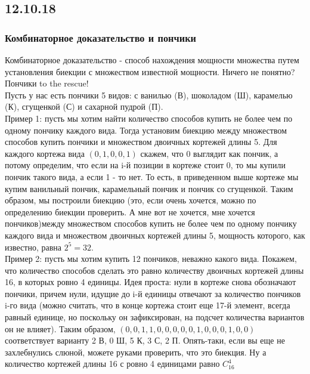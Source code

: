 \subsection{12.10.18}
\subsubsection{Комбинаторное доказательство и пончики}
Комбинаторное доказательство - способ нахождения мощности множества путем установления биекции с множеством известной мощности. Ничего не понятно? Пончики to the rescue!\\
Пусть у нас есть пончики 5 видов: с ванилью (В), шоколадом (Ш), карамелью (К), сгущенкой (С) и сахарной пудрой (П).\\
Пример 1: пусть мы хотим найти количество способов купить не более чем по одному пончику каждого вида. Тогда установим биекцию между множеством способов купить пончики и множеством двоичных кортежей длины 5. Для каждого кортежа вида $(0, 1, 0, 0, 1)$ скажем, что 0 выглядит как пончик, а потому определим, что если на i-й позиции в кортеже стоит 0, то мы купили пончик такого вида, а если 1 - то нет. То есть, в приведенном выше кортеже мы купим ванильный пончик, карамельный пончик и пончик со сгущенкой. Таким образом, мы построили биекцию (это, если очень хочется, можно по определению биекции проверить. А мне вот не хочется, мне хочется пончиков)между множеством способов купить не более чем по одному пончику каждого вида и множеством двоичных кортежей длины 5, мощность которого, как известно, равна $2^5 = 32$.\\
Пример 2: пусть мы хотим купить 12 пончиков, неважно какого вида. Покажем, что количество способов сделать это равно количеству двоичных кортежей длины 16, в которых ровно 4 единицы. Идея проста: нули в кортеже снова обозначают пончики, причем нули, идущие до i-й единицы отвечают за количество пончиков i-го вида (можно считать, что в конце кортежа стоит еще 17-й элемент, всегда равный единице, но поскольку он зафиксирован, на подсчет количества вариантов он не влияет). Таким образом, $(0, 0, 1, 1, 0, 0, 0, 0, 0, 1, 0, 0, 0, 1, 0, 0)$ соответствует варианту 2 В, 0 Ш, 5 К, 3 С, 2 П. Опять-таки, если вы еще не захлебнулись слюной, можете руками проверить, что это биекция. Ну а количество кортежей длины 16 с ровно 4 единицами равно $C_{16}^4$